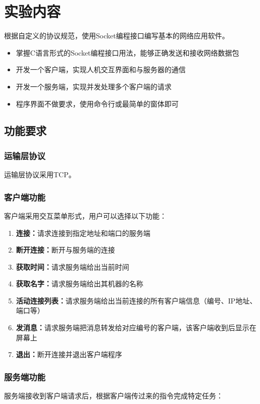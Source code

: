 \documentclass[12pt,a4paper]{article}
\begin{document}
\section{实验内容}

根据自定义的协议规范，使用Socket编程接口编写基本的网络应用软件。

\begin{itemize}[leftmargin=2em]
    \item 掌握C语言形式的Socket编程接口用法，能够正确发送和接收网络数据包
    \item 开发一个客户端，实现人机交互界面和与服务器的通信
    \item 开发一个服务端，实现并发处理多个客户端的请求
    \item 程序界面不做要求，使用命令行或最简单的窗体即可
\end{itemize}

\subsection{功能要求}

\subsubsection{运输层协议}
运输层协议采用TCP。

\subsubsection{客户端功能}
客户端采用交互菜单形式，用户可以选择以下功能：

\begin{enumerate}
    \item \textbf{连接：}请求连接到指定地址和端口的服务端
    \item \textbf{断开连接：}断开与服务端的连接
    \item \textbf{获取时间：}请求服务端给出当前时间
    \item \textbf{获取名字：}请求服务端给出其机器的名称
    \item \textbf{活动连接列表：}请求服务端给出当前连接的所有客户端信息（编号、IP地址、端口等）
    \item \textbf{发消息：}请求服务端把消息转发给对应编号的客户端，该客户端收到后显示在屏幕上
    \item \textbf{退出：}断开连接并退出客户端程序
\end{enumerate}

\subsubsection{服务端功能}
服务端接收到客户端请求后，根据客户端传过来的指令完成特定任务：
\end{document}
